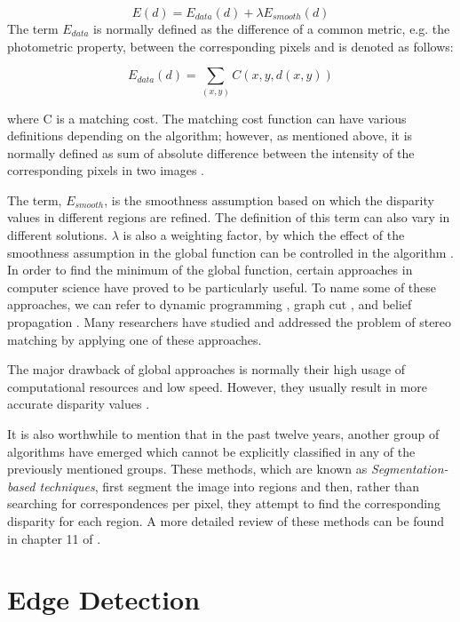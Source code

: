 \begin{equation}
E(d)=E_{data}(d)+\lambda E_{smooth}(d)
\end{equation}
The term $E_{data}$ is normally defined as the difference of a common metric, e.g. the photometric property, between the corresponding pixels and is denoted as follows:

\begin{equation}
E_{data}(d) = \sum_{(x,y)}C(x,y,d(x,y))
\end{equation}

where C is a matching cost. The matching cost function can have various definitions depending on the algorithm; however, as mentioned above, it is normally defined as sum of absolute difference 
between the intensity of the corresponding pixels in two images \cite{sch02}.

The term, $E_{smooth}$, is the smoothness assumption based on which the disparity values in different regions are refined. The definition of this term can also vary in 
different solutions. $\lambda$ is also a weighting factor, by which the effect of the smoothness assumption in the global function can be controlled in the algorithm \cite{sze11}.
In order to find the minimum of the global function, certain approaches in computer science have proved to be particularly useful. 
To name some of these approaches, we can refer to dynamic programming \cite{kim05}, graph cut \cite{boy01,boyk01,boy04}, and belief propagation \cite{sun11}. 
Many researchers have studied and addressed the problem of stereo matching
by applying one of these approaches.

The major drawback of global approaches is normally their high usage of computational resources and low speed. However, 
they usually result in more accurate disparity values \cite{hirsch02,sze11}. 

It is also worthwhile to mention that in the past twelve years, another group of algorithms have emerged which cannot be explicitly classified in any of the previously mentioned groups.
These methods, which are known as {\it Segmentation-based techniques}, first segment the image into regions and then, rather than searching for correspondences per pixel,
they attempt to find the corresponding disparity for each region. A more detailed review of these methods can be found in chapter 11 of \cite{sze11}.

\section{Edge Detection}


